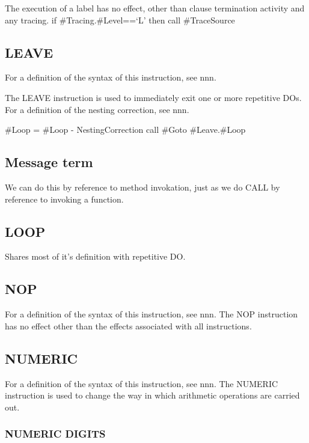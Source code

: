 The execution of a label has no effect, other than clause termination
activity and any tracing. if \#Tracing.\#Level==`L' then call
\#TraceSource

\subsection{LEAVE}\label{leave}

For a definition of the syntax of this instruction, see nnn.

The LEAVE instruction is used to immediately exit one or more repetitive
DOs. For a definition of the nesting correction, see nnn.

\#Loop = \#Loop - NestingCorrection call \#Goto \#Leave.\#Loop

\subsection{Message term}\label{message-term}

We can do this by reference to method invokation, just as we do CALL by
reference to invoking a function.

\subsection{LOOP}\label{loop}

Shares most of it's definition with repetitive DO.

\subsection{NOP}\label{nop}

For a definition of the syntax of this instruction, see nnn. The NOP
instruction has no effect other than the effects associated with all
instructions.

\subsection{NUMERIC}\label{numeric}

For a definition of the syntax of this instruction, see nnn. The NUMERIC
instruction is used to change the way in which arithmetic operations are
carried out.

\subsubsection{NUMERIC DIGITS}\label{numeric-digits}

